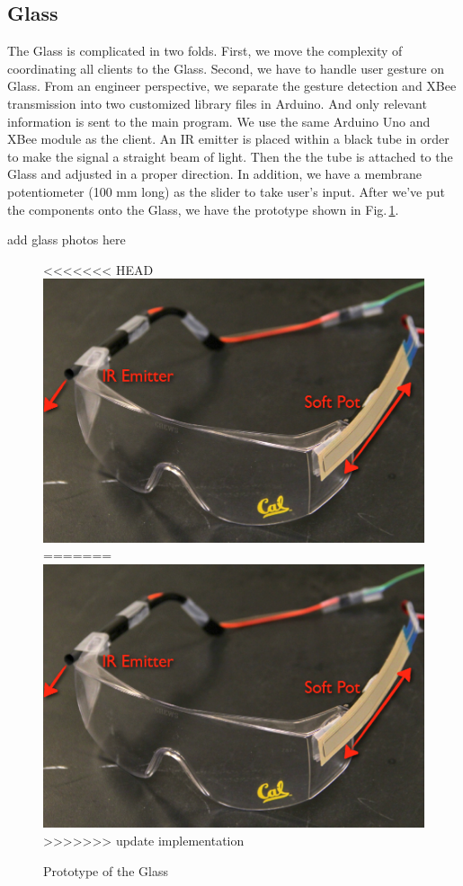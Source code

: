 \subsection{Glass}
\label{sec:glass}

The Glass is complicated in two folds. First, we move the complexity of coordinating all clients to the Glass. Second, we have to handle user gesture on Glass. From an engineer perspective, we separate the gesture detection and XBee transmission into two customized library files in Arduino. And only relevant information is sent to the main program. We use the same Arduino Uno and XBee module as the client. An IR emitter is placed within a black tube in order to make the signal a straight beam of light. Then the the tube is attached to the Glass and adjusted in a proper direction. In addition, we have a membrane potentiometer (100 mm long) as the slider to take user's input. After we've put the components onto the Glass, we have the prototype shown in Fig.\,\ref{fig:glass}.

{\color{red} add glass photos here}
\begin{figure}
  \centering
<<<<<<< HEAD
  \includegraphics[width=0.85\linewidth]{../figs/glass.png}
=======
  \includegraphics[width=\linewidth]{../figs/glass.png}
>>>>>>> update implementation
  \caption{Prototype of the Glass}
  \label{fig:glass}
\end{figure}


